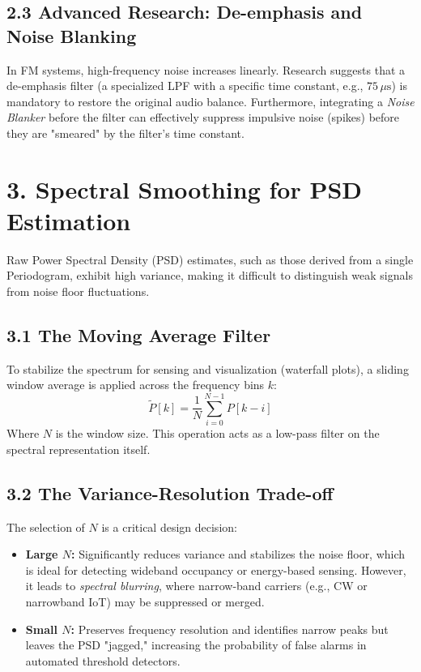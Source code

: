\documentclass[11pt]{report}
\begin{document}
\subsection*{2.3 Advanced Research: De-emphasis and Noise Blanking}
In FM systems, high-frequency noise increases linearly. Research suggests that a de-emphasis filter (a specialized LPF with a specific time constant, e.g., $75\,\mu\text{s}$) is mandatory to restore the original audio balance. Furthermore, integrating a \textit{Noise Blanker} before the filter can effectively suppress impulsive noise (spikes) before they are "smeared" by the filter's time constant.

\section*{3. Spectral Smoothing for PSD Estimation}
Raw Power Spectral Density (PSD) estimates, such as those derived from a single Periodogram, exhibit high variance, making it difficult to distinguish weak signals from noise floor fluctuations.

\subsection*{3.1 The Moving Average Filter}
To stabilize the spectrum for sensing and visualization (waterfall plots), a sliding window average is applied across the frequency bins $k$:
\[
\tilde{P}[k] = \frac{1}{N} \sum_{i=0}^{N-1} P[k-i]
\]
Where $N$ is the window size. This operation acts as a low-pass filter on the spectral representation itself.

\subsection*{3.2 The Variance-Resolution Trade-off}
The selection of $N$ is a critical design decision:
\begin{itemize}[leftmargin=*]
    \item \textbf{Large $N$:} Significantly reduces variance and stabilizes the noise floor, which is ideal for detecting wideband occupancy or energy-based sensing. However, it leads to \textit{spectral blurring}, where narrow-band carriers (e.g., CW or narrowband IoT) may be suppressed or merged.
    \item \textbf{Small $N$:} Preserves frequency resolution and identifies narrow peaks but leaves the PSD "jagged," increasing the probability of false alarms in automated threshold detectors.
\end{itemize}
\end{document}
